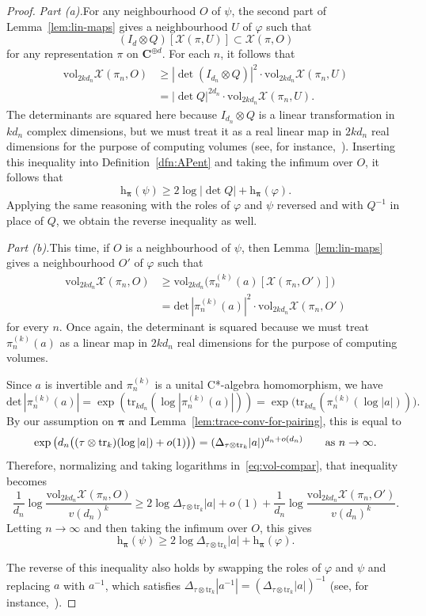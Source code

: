 \documentclass[12pt,a4paper]{article}
\numberwithin{equation}{section}
\theoremstyle{remark}
\newcommand{\bbC}{\mathbf{C}}
\newcommand{\rmh}{\mathrm{h}}
\newcommand{\X}{\mathcal{X}}
\renewcommand{\phi}{\varphi}
\newcommand{\bspi}{\boldsymbol{\pi}}
\newcommand{\vol}{\mathrm{vol}}
\newcommand{\Tr}{\mathrm{tr}}
\newcommand{\Det}{\mathrm{det}}
\begin{document}
\begin{proof}
\emph{Part (a).}\quad For any neighbourhood $O$ of $\psi$, the second part of Lemma~\ref{lem:lin-maps} gives a neighbourhood $U$ of $\phi$ such that
\[(I_d\otimes Q)[\X(\pi,U)] \subset \X(\pi,O)\]
for any representation $\pi$ on $\bbC^{\oplus d}$.  For each $n$, it follows that
\begin{align*}
\vol_{2kd_n}\X(\pi_n,O) &\ge |\det (I_{d_n}\otimes Q)|^2\cdot \vol_{2kd_n}\X(\pi_n,U) \\ &= |\det Q|^{2d_n}\cdot \vol_{2kd_n}\X(\pi_n,U).
\end{align*}
The determinants are squared here because $I_{d_n}\otimes Q$ is a linear transformation in $kd_n$ complex dimensions, but we must treat it as a real linear map in $2kd_n$ real dimensions for the purpose of computing volumes (see, for instance,~\cite[Subsec. 1.3.5]{RudinFTUB}).  Inserting this inequality into Definition~\ref{dfn:APent} and taking the infimum over $O$, it follows that
\[\rmh_{\bspi}(\psi) \ge 2\log|\det Q| + \rmh_{\bspi}(\phi).\]
Applying the same reasoning with the roles of $\phi$ and $\psi$ reversed and with $Q^{-1}$ in place of $Q$, we obtain the reverse inequality as well.

\vspace{7pt}

\emph{Part (b).}\quad This time, if $O$ is a neighbourhood of $\psi$, then Lemma~\ref{lem:lin-maps} gives a neighbourhood $O'$ of $\phi$ such that
	\begin{align}\label{eq:vol-compar}
\vol_{2kd_n}\X(\pi_n,O) &\ge \vol_{2kd_n}\big(\pi_n^{(k)}(a)[\X(\pi_n,O')]\big) \nonumber \\ &= \Det\,|\pi_n^{(k)}(a)|^2\cdot \vol_{2kd_n}\X(\pi_n,O')
\end{align}
for every $n$.  Once again, the determinant is squared because we must treat $\pi_n^{(k)}(a)$ as a linear map in $2kd_n$ real dimensions for the purpose of computing volumes.

Since $a$ is invertible and $\pi_n^{(k)}$ is a unital C*-algebra homomorphism, we have
\[\Det\,|\pi_n^{(k)}(a)| = \exp(\Tr_{kd_n}(\log |\pi_n^{(k)}(a)|)) = \exp\big(\Tr_{kd_n}(\pi_n^{(k)}(\log|a|))\big).\]
By our assumption on $\bspi$ and Lemma~\ref{lem:trace-conv-for-pairing}, this is equal to
\[\exp\big(d_n\big((\tau\otimes \Tr_k) (\log |a|) + o(1)\big)\big) = (\Delta_{\tau\otimes \Tr_k}|a|)^{d_n + o(d_n)} \qquad \hbox{as}\ n\to\infty.\]
Therefore, normalizing and taking logarithms in~\eqref{eq:vol-compar}, that inequality becomes
\[\frac{1}{d_n}\log \frac{\vol_{2kd_n}\X(\pi_n,O)}{v(d_n)^k} \ge 2\log \Delta_{\tau\otimes \Tr_k}|a| + o(1) + \frac{1}{d_n}\log \frac{\vol_{2kd_n}\X(\pi_n,O')}{v(d_n)^k}.\]
Letting $n\to\infty$ and then taking the infimum over $O$, this gives
	\[\rmh_{\bspi}(\psi) \ge 2\log \Delta_{\tau\otimes \Tr_k}|a| + \rmh_{\bspi}(\phi).\]

The reverse of this inequality also holds by swapping the roles of $\phi$ and $\psi$ and replacing $a$ with $a^{-1}$, which satisfies $\Delta_{\tau\otimes \Tr_k}|a^{-1}| = (\Delta_{\tau\otimes \Tr_k}|a|)^{-1}$ (see, for instance,~\cite[Thm. I.6.10(iii)]{Dix--vN}).
\end{proof}
\end{document}
